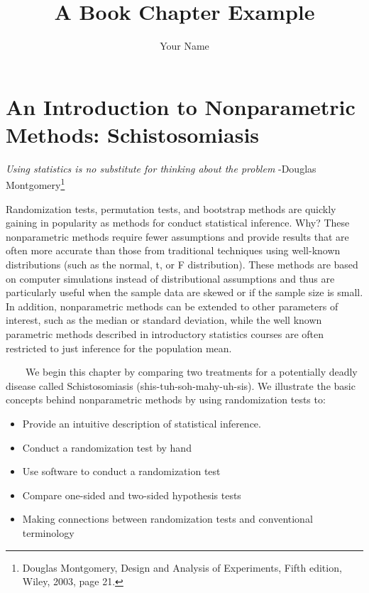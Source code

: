 \documentclass[
]{report}
\title{A Book Chapter Example}
\author{Your Name}
\date{}
\providecommand{\tightlist}{%
  \setlength{\itemsep}{0pt}\setlength{\parskip}{0pt}}
\theoremstyle{definition}
\theoremstyle{definition}
\theoremstyle{definition}
\theoremstyle{definition}
\theoremstyle{remark}
\begin{document}
\maketitle

{
\setcounter{tocdepth}{1}
\tableofcontents
}
\hypertarget{an-introduction-to-nonparametric-methods-schistosomiasis}{%
\chapter{An Introduction to Nonparametric Methods: Schistosomiasis}\label{an-introduction-to-nonparametric-methods-schistosomiasis}}

\emph{Using statistics is no substitute for thinking about the problem}
-Douglas Montgomery\footnote{Douglas Montgomery, Design and Analysis of Experiments, Fifth edition, Wiley, 2003, page 21.}

Randomization tests, permutation tests, and bootstrap methods are quickly gaining in popularity as methods for conduct statistical inference. Why? These nonparametric methods require fewer assumptions and provide results that are often more accurate than those from traditional techniques using well-known distributions (such as the normal, t, or F distribution). These methods are based on computer simulations instead of distributional assumptions and thus are particularly useful when the sample data are skewed or if the sample size is small. In addition, nonparametric methods can be extended to other parameters of interest, such as the median or standard deviation, while the well known parametric methods described in introductory statistics courses are often restricted to just inference for the population mean.

~~~~We begin this chapter by comparing two treatments for a potentially deadly disease called Schistosomiasis (shis-tuh-soh-mahy-uh-sis). We illustrate the basic concepts behind nonparametric methods by using randomization tests to:

\begin{itemize}
\tightlist
\item
  Provide an intuitive description of statistical inference.
\item
  Conduct a randomization test by hand
\item
  Use software to conduct a randomization test
\item
  Compare one-sided and two-sided hypothesis tests
\item
  Making connections between randomization tests and conventional terminology
\end{itemize}
\end{document}
